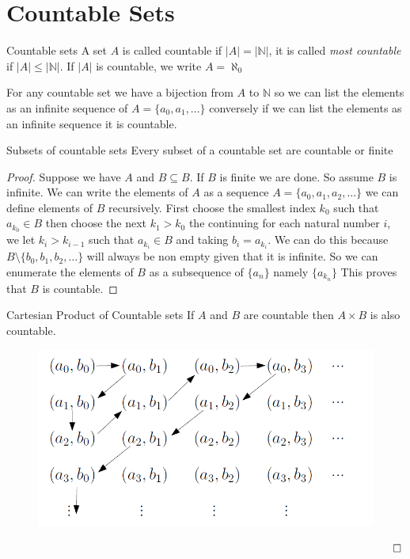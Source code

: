 \documentclass[16pt,a4paper]{article}
\theoremstyle{definition}
\begin{document}
\newpage

\section{Countable Sets}
\begin{defn}{Countable sets}{}
A set $A$ is called countable if $|A| = |\mathbb{N}|$, it is called \textit{most countable} if $|A|\leq |\mathbb{N}|$. If $|A|$ is countable, we write $A = \aleph_0$ 
\end{defn}
For any countable set we have a bijection from $A$ to $\mathbb{N}$ so we can list the elements as an infinite sequence  of $A = \{a_0, a_1, \ldots \}$ conversely if we can list the elements as an infinite sequence it is countable. 

\begin{lemm}{Subsets of countable sets}{} \label{lem3}
Every subset of a countable set are countable or finite
\end{lemm}
\begin{proof}
Suppose we have $A$ and $B\subseteq B$. If $B$ is finite we are done. So assume $B$ is infinite. We can write the elements of $A$ as a sequence $A = \{a_0, a_1, a_2, \ldots \}$  we can define elements of $B$ recursively. First choose the smallest index $k_0$ such that $a_{k_0} \in B$ then choose the next $k_1>k_0$ the continuing for each natural number $i$, we let $k_i > k_{i-1}$ such that $a_{k_i}\in B$ and taking $b_i = a_{k_i}$. We can do this because $B\setminus \{b_0, b_1, b_2, \ldots\}$ will always be non empty given that it is infinite. So we can enumerate the elements of $B$ as a subsequence of $\{a_n\}$ namely $\{a_{k_n}\}$  This proves that $B$ is countable. 
\end{proof}


\begin{lemm}{Cartesian Product of Countable sets}{}\label{lem4}
If $A$ and $B$ are countable then $A\times B$ is also countable.
\end{lemm}

\begin{figure}[hbtp]
\centering
\includegraphics[scale=1]{figs/fig0.png}
\end{figure}
$\qquad\qquad\qquad\qquad\qquad\qquad\qquad\qquad\qquad\qquad\qquad\qquad\qquad\qquad\qquad\qquad\qquad\qed$
\end{document}
